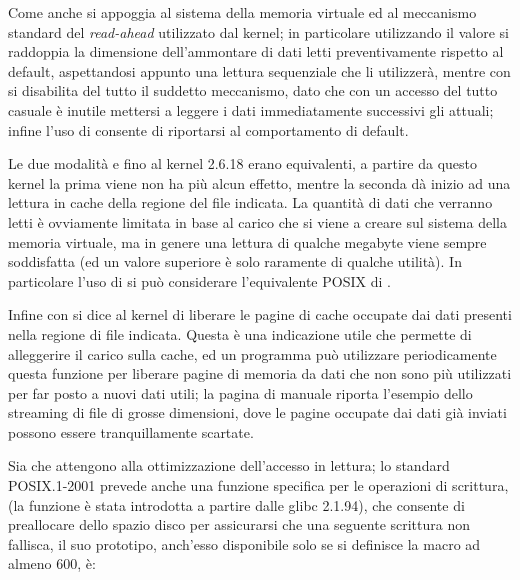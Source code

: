 Come  anche  si appoggia al sistema della
memoria virtuale ed al meccanismo standard del \textit{read-ahead} utilizzato
dal kernel; in particolare utilizzando il valore
 si raddoppia la dimensione dell'ammontare di
dati letti preventivamente rispetto al default, aspettandosi appunto una
lettura sequenziale che li utilizzerà, mentre con 
si disabilita del tutto il suddetto meccanismo, dato che con un accesso del
tutto casuale è inutile mettersi a leggere i dati immediatamente successivi
gli attuali; infine l'uso di  consente di
riportarsi al comportamento di default.

Le due modalità  e 
fino al kernel 2.6.18 erano equivalenti, a partire da questo kernel la prima
viene non ha più alcun effetto, mentre la seconda dà inizio ad una lettura in
cache della regione del file indicata.  La quantità di dati che verranno letti
è ovviamente limitata in base al carico che si viene a creare sul sistema
della memoria virtuale, ma in genere una lettura di qualche megabyte viene
sempre soddisfatta (ed un valore superiore è solo raramente di qualche
utilità). In particolare l'uso di  si può
considerare l'equivalente POSIX di .

Infine con  si dice al kernel di liberare le
pagine di cache occupate dai dati presenti nella regione di file indicata.
Questa è una indicazione utile che permette di alleggerire il carico sulla
cache, ed un programma può utilizzare periodicamente questa funzione per
liberare pagine di memoria da dati che non sono più utilizzati per far posto a
nuovi dati utili; la pagina di manuale riporta l'esempio dello streaming di
file di grosse dimensioni, dove le pagine occupate dai dati già inviati
possono essere tranquillamente scartate.

Sia  che  attengono alla ottimizzazione
dell'accesso in lettura; lo standard POSIX.1-2001 prevede anche una funzione
specifica per le operazioni di scrittura,  (la
funzione è stata introdotta a partire dalle glibc 2.1.94), che consente di
preallocare dello spazio disco per assicurarsi che una seguente scrittura non
fallisca, il suo prototipo, anch'esso disponibile solo se si definisce la
macro  ad almeno 600, è:

